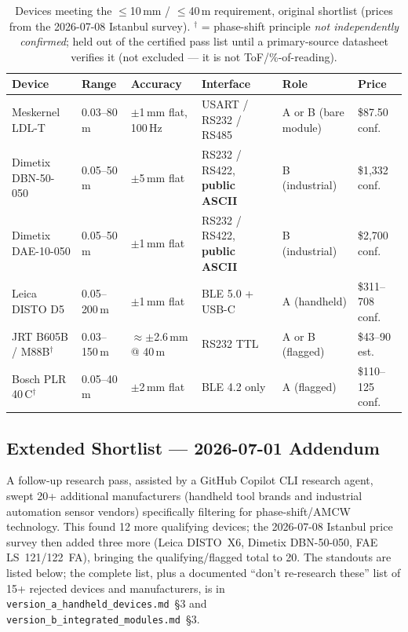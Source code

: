 \documentclass[11pt]{article}
\begin{document}
\begin{table}[htbp]
\centering
\small
\begin{tabular}{@{}p{2.4cm}p{1.5cm}p{2.0cm}p{2.9cm}p{2.0cm}p{2.0cm}@{}}
\toprule
\textbf{Device} & \textbf{Range} & \textbf{Accuracy} & \textbf{Interface} & \textbf{Role} & \textbf{Price} \\
\midrule
Meskernel LDL-T & 0.03--80\,m & $\pm$1\,mm flat, 100\,Hz & USART / RS232 / RS485 & A or B (bare module) & \$87.50 conf. \\
Dimetix DBN-50-050 & 0.05--50\,m & $\pm$5\,mm flat & RS232 / RS422, \textbf{public ASCII} & B (industrial) & \$1{,}332 conf. \\
Dimetix DAE-10-050 & 0.05--50\,m & $\pm$1\,mm flat & RS232 / RS422, \textbf{public ASCII} & B (industrial) & \$2{,}700 conf. \\
Leica DISTO D5 & 0.05--200\,m & $\pm$1\,mm flat & BLE 5.0 + USB-C & A (handheld) & \$311--708 conf. \\
JRT B605B / M88B$^\dagger$ & 0.03--150\,m & $\approx\pm$2.6\,mm @ 40\,m & RS232 TTL & A or B (flagged) & \$43--90 est. \\
Bosch PLR 40\,C$^\dagger$ & 0.05--40\,m & $\pm$2\,mm flat & BLE 4.2 only & A (flagged) & \$110--125 conf. \\
\bottomrule
\end{tabular}
\caption{Devices meeting the $\leq$10\,mm / $\leq$40\,m requirement, original shortlist (prices from the 2026-07-08 Istanbul survey). $^\dagger$ = phase-shift principle \emph{not independently confirmed}; held out of the certified pass list until a primary-source datasheet verifies it (not excluded --- it is not ToF/\%-of-reading).}
\end{table}

\subsection{Extended Shortlist --- 2026-07-01 Addendum}

A follow-up research pass, assisted by a GitHub Copilot CLI research agent, swept 20+ additional manufacturers (handheld tool brands and industrial automation sensor vendors) specifically filtering for phase-shift/AMCW technology. This found 12 more qualifying devices; the 2026-07-08 Istanbul price survey then added three more (Leica DISTO~X6, Dimetix DBN-50-050, FAE LS~121/122~FA), bringing the qualifying/flagged total to 20. The standouts are listed below; the complete list, plus a documented ``don't re-research these'' list of 15+ rejected devices and manufacturers, is in \texttt{version\_a\_handheld\_devices.md}~\S3 and \texttt{version\_b\_integrated\_modules.md}~\S3.
\end{document}

